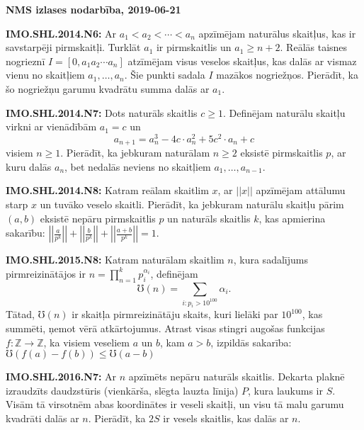 \documentclass[11pt]{article}
\newenvironment{uzdevums}[1][\unskip]{%
\vspace{3mm}
\noindent
\textbf{#1:}
\noindent}
{}
\begin{document}
\thispagestyle{empty}

{\Large \bf NMS izlases nodarbība, 2019-06-21}

{\small
\begin{uzdevums}[IMO.SHL.2014.N6]
Ar $a_1 < a_2 <  \cdots <a_n$ apzīmējam naturālus skaitļus, kas ir 
savstarpēji pirmskaitļi. Turklāt $a_1$ ir pirmskaitlis un
$a_1 \geq n + 2$. Reālās taisnes nogrieznī 
$I = [0, a_1 a_2  \cdots a_n ]$ 
atzīmējam visus veselos skaitļus, kas dalās ar vismaz vienu no 
skaitļiem
$a_1, \ldots, a_n$. Šie punkti sadala $I$ mazākos nogriežņos.
Pierādīt, ka šo nogriežņu garumu kvadrātu summa dalās ar $a_1$. 
\end{uzdevums}


\begin{uzdevums}[IMO.SHL.2014.N7]
Dots naturāls skaitlis $c \ge 1$. Definējam naturālu skaitļu 
virkni ar vienādībām $a_1 = c$ un
$$a_{n+1}=a_n^3-4c\cdot a_n^2+5c^2\cdot a_n+c$$ 
visiem $n \geq 1$. 
Pierādīt, ka jebkuram naturālam $n \geq 2$ eksistē
pirmskaitlis $p$, ar kuru dalās $a_n$, bet nedalās 
neviens no skaitļiem $a_1,\ldots,a_{n-1}$.
\end{uzdevums}

\begin{uzdevums}[IMO.SHL.2014.N8]
Katram reālam skaitlim $x$, ar $||x||$ apzīmējam 
attālumu starp $x$ un tuvāko veselo skaitli. 
Pierādīt, ka jebkuram naturālu skaitļu pārim $(a,b)$
eksistē nepāru pirmskaitlis $p$ un naturāls skaitlis $k$, 
kas apmierina sakarību:
$\left|\left|\frac{a}{p^k}\right|\right| + 
\left|\left|\frac{b}{p^k}\right|\right| + 
\left|\left|\frac{a+b}{p^k}\right|\right|=1.$
\end{uzdevums}


\begin{uzdevums}[IMO.SHL.2015.N8]
Katram naturālam skaitlim $n$, kura sadalījums pirmreizinātājos ir 
$n = \prod_{n=1}^k p_i^{\alpha_i}$, definējam
$$\mho(n) = \sum_{i:p_i > 10^{100}} \alpha_i.$$
Tātad, $\mho(n)$ ir skaitļa pirmreizinātāju skaits, kuri lielāki par
$10^{100}$, kas summēti, ņemot vērā atkārtojumus.
Atrast visas stingri augošas funkcijas $f:\mathbb{Z} \rightarrow \mathbb{Z}$, 
ka visiem veseliem $a$ un $b$, kam $a>b$, izpildās sakarība:
$\mho\left( f(a) - f(b) \right) \leq \mho(a-b)$
\end{uzdevums}

\begin{uzdevums}[IMO.SHL.2016.N7]
Ar $n$ apzīmēts nepāru naturāls skaitlis. Dekarta plaknē 
izraudzīts daudzstūris (vienkārša, slēgta lauzta līnija) $P$, 
kura laukums ir $S$. Visām tā virsotnēm abas koordinātes
ir veseli skaitļi, un visu tā malu garumu kvadrāti dalās ar $n$. 
Pierādīt, ka $2S$ ir vesels skaitlis, kas dalās ar $n$.
\end{uzdevums}


}
\end{document}
